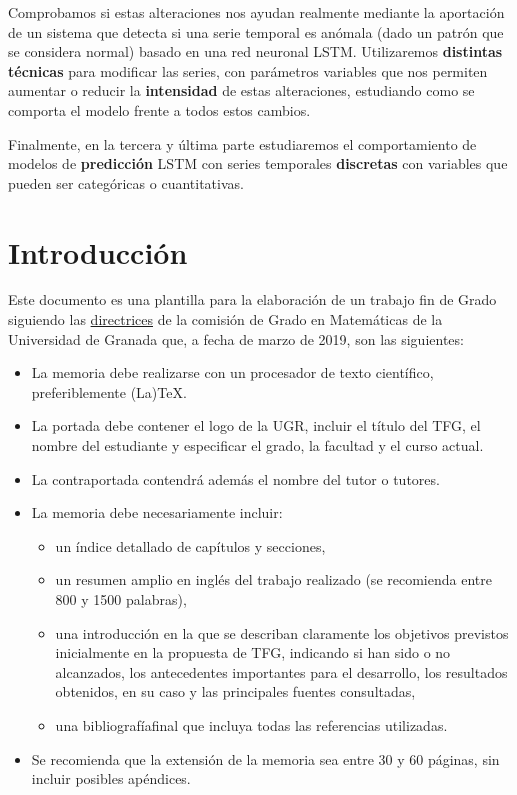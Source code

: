 Comprobamos si estas alteraciones nos ayudan realmente mediante la aportación de un sistema que detecta si una serie temporal es anómala (dado un patrón que se considera normal) basado en una red neuronal LSTM. Utilizaremos \textbf{distintas técnicas} para modificar las series, con parámetros variables que nos permiten aumentar o reducir la \textbf{intensidad} de estas alteraciones, estudiando como se comporta el modelo frente a todos estos cambios.

Finalmente, en la tercera y última parte estudiaremos el comportamiento de modelos de \textbf{predicción} LSTM con series temporales \textbf{discretas} con variables que pueden ser categóricas o cuantitativas.

\section{Introducción}
Este documento es una plantilla para la elaboración de un trabajo fin de Grado siguiendo las \href{http://grados.ugr.es/matematicas/pages/infoacademica/tfg/fechaseinstruccionesdefensatfgcurso20172018/!}{directrices} de la comisión de Grado en Matemáticas de la Universidad de Granada que, a fecha de marzo de 2019, son las siguientes:

\begin{itemize}
  \item La  memoria  debe  realizarse  con  un  procesador  de  texto  científico,  preferiblemente (La)TeX.
  \item La portada  debe contener  el  logo  de  la UGR,  incluir  el  título del TFG, el nombre del estudiante y especificar el grado, la facultad y el curso actual.
  \item La contraportada contendrá además el nombre del tutor o tutores.
  \item La memoria debe necesariamente incluir:
    \begin{itemize}
      \item un índice detallado de capítulos y secciones,
      \item un resumen amplio en inglés del trabajo realizado (se recomienda entre 800 y 1500 palabras),
      \item una introducción en la que se describan claramente los objetivos previstos inicialmente en la propuesta de TFG, indicando si han sido o no alcanzados, los antecedentes importantes para el desarrollo, los resultados obtenidos, en su caso y las principales fuentes consultadas,
      \item una bibliografíafinal que incluya todas las referencias utilizadas.
    \end{itemize}
  \item Se recomienda que la extensión de la memoria sea entre 30 y 60 páginas, sin incluir posibles apéndices.
\end{itemize}

